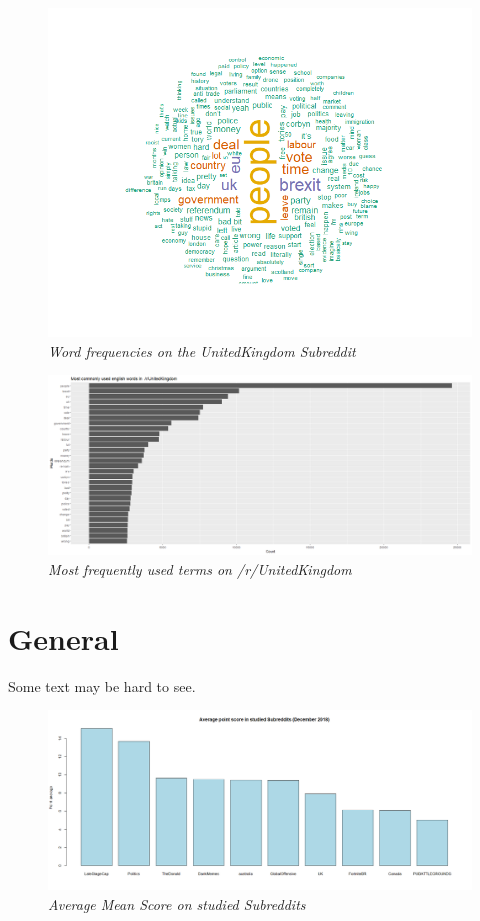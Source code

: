 \begin{figure}[ht]
    \centering
    \includegraphics[width=1.0\textwidth]{graphs/UnitedKingdom/WordCloud_UK.png}
    \caption{\textit{Word frequencies on the UnitedKingdom Subreddit}}
    \label{fig:uk_cloud}
\end{figure}

\begin{figure}[H]
    \centering
    \includegraphics[width=1.0\textwidth]{graphs/UnitedKingdom/WordFreq_UK.png}
    \caption{\textit{Most frequently used terms on /r/UnitedKingdom}}
    \label{fig:uk_wordfreq}
\end{figure}

\section{General}
Some text may be hard to see.
\begin{figure}[ht]
    \centering
    \includegraphics[width=1.0\textwidth]{graphs/Average_meanscore.png}
    \caption{\textit{Average Mean Score on studied Subreddits}}
    \label{fig:avgScore}
\end{figure}

